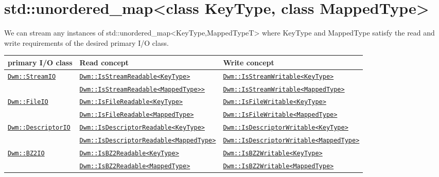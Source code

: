 \begin{minipage}{\textwidth}
\section{\ttfamily std::unordered\_map<class KeyType, class MappedType>}
We can stream any instances of
{\ttfamily std::unordered\_map<KeyType,MappedTypeT>} where
{\ttfamily KeyType} and {\ttfamily MappedType} satisfy the read
and write requirements of the desired primary I/O class.
\vspace{1ex}

\begin{tabular}{lll}
\textbf{primary I/O class} & \textbf{Read concept} & \textbf{Write concept} \\ \hline
\multirow{2}{*}{\hyperref[section:DwmStreamIOClass]{\texttt{Dwm::StreamIO}}} & \hyperref[concept:DwmIsStreamReadable]{\texttt{Dwm::IsStreamReadable<KeyType>}} & \hyperref[concept:DwmIsStreamWritable]{\texttt{Dwm::IsStreamWritable<KeyType>}} \\
 & \hyperref[concept:DwmIsStreamReadable]{\texttt{Dwm::IsStreamReadable<MappedType>>}} & \hyperref[concept:DwmIsStreamWritable]{\texttt{Dwm::IsStreamWritable<MappedType>}} \\ \hline
\multirow{2}{*}{\hyperref[section:DwmFileIOClass]{\texttt{Dwm::FileIO}}} & \hyperref[concept:DwmIsFileReadable]{\texttt{Dwm::IsFileReadable<KeyType>}} & \hyperref[concept:DwmIsFileWritable]{\texttt{Dwm::IsFileWritable<KeyType>}} \\
 & \hyperref[concept:DwmIsFileReadable]{\texttt{Dwm::IsFileReadable<MappedType>}} & \hyperref[concept:DwmIsFileWritable]{\texttt{Dwm::IsFileWritable<MappedType>}} \\ \hline
\multirow{2}{*}{\hyperref[section:DwmDescriptorIOClass]{\texttt{Dwm::DescriptorIO}}} & \hyperref[concept:DwmIsDescriptorReadable]{\texttt{Dwm::IsDescriptorReadable<KeyType>}} & \hyperref[concept:DwmIsDescriptorWritable]{\texttt{Dwm::IsDescriptorWritable<KeyType>}} \\
 & \hyperref[concept:DwmIsDescriptorReadable]{\texttt{Dwm::IsDescriptorReadable<MappedType>}} & \hyperref[concept:DwmIsDescriptorWritable]{\texttt{Dwm::IsDescriptorWritable<MappedType>}} \\ \hline
\multirow{2}{*}{\hyperref[section:DwmBZ2IOClass]{\texttt{Dwm::BZ2IO}}} & \hyperref[concept:DwmIsBZ2Readable]{\texttt{Dwm::IsBZ2Readable<KeyType>}} & \hyperref[concept:DwmIsBZ2Writable]{\texttt{Dwm::IsBZ2Writable<KeyType>}} \\
 & \hyperref[concept:DwmIsBZ2Readable]{\texttt{Dwm::IsBZ2Readable<MappedType>}} & \hyperref[concept:DwmIsBZ2Writable]{\texttt{Dwm::IsBZ2Writable<MappedType>}} \\ \hline

\end{tabular}
\end{minipage}
